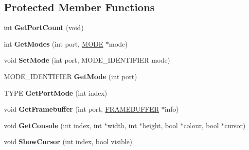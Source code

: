 \subsection*{Protected Member Functions}
\begin{DoxyCompactItemize}
\item 
\mbox{\label{class_multiboot_video_a1e8f1308d8e1dd2acba1159d2c12e6e5}} 
int {\bfseries Get\+Port\+Count} (void)
\item 
\mbox{\label{class_multiboot_video_ac2c1339147b7d9c0c18cd207ef71dc32}} 
int {\bfseries Get\+Modes} (int port, \hyperlink{struct_generic_video_1_1_m_o_d_e}{M\+O\+DE} $\ast$mode)
\item 
\mbox{\label{class_multiboot_video_a0571599f2635c0d98f5af5b3cd288a0b}} 
void {\bfseries Set\+Mode} (int port, M\+O\+D\+E\+\_\+\+I\+D\+E\+N\+T\+I\+F\+I\+ER mode)
\item 
\mbox{\label{class_multiboot_video_a931be7f7c26ab397eabe072296aa3c85}} 
M\+O\+D\+E\+\_\+\+I\+D\+E\+N\+T\+I\+F\+I\+ER {\bfseries Get\+Mode} (int port)
\item 
\mbox{\label{class_multiboot_video_a6c7e27619781736ec7a6695c1aad0ac0}} 
T\+Y\+PE {\bfseries Get\+Port\+Mode} (int index)
\item 
\mbox{\label{class_multiboot_video_a1bca5ae7476c4df3cecbfc055aeb59b7}} 
void {\bfseries Get\+Framebuffer} (int port, \hyperlink{struct_generic_video_1_1_f_r_a_m_e_b_u_f_f_e_r}{F\+R\+A\+M\+E\+B\+U\+F\+F\+ER} $\ast$info)
\item 
\mbox{\label{class_multiboot_video_a02678c884301af1674b7e93c92153a9e}} 
void {\bfseries Get\+Console} (int index, int $\ast$width, int $\ast$height, bool $\ast$colour, bool $\ast$cursor)
\item 
\mbox{\label{class_multiboot_video_a8a1a3811b4adaf033cb0cdfa365c67b7}} 
void {\bfseries Show\+Cursor} (int index, bool visible)
\item 
\mbox{\label{class_multiboot_video_a9fe34073a9259a9c9c934344b8dfa562}} 

\end{DoxyCompactItemize}
